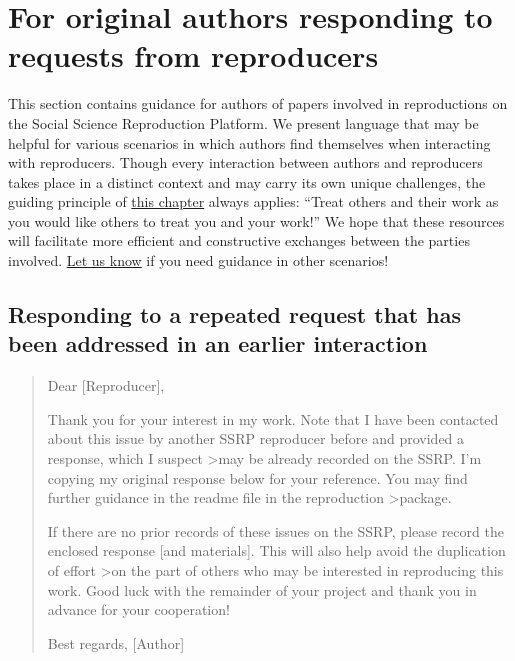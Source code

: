 \documentclass[
]{book}
\begin{document}
\hypertarget{for-original-authors-responding-to-requests-from-reproducers}{%
\section{For original authors responding to requests from reproducers}\label{for-original-authors-responding-to-requests-from-reproducers}}

This section contains guidance for authors of papers involved in reproductions on the Social Science Reproduction Platform. We present language that may be helpful for various scenarios in which authors find themselves when interacting with reproducers. Though every interaction between authors and reproducers takes place in a distinct context and may carry its own unique challenges, the guiding principle of \href{https://bitss.github.io/ACRE/guidance-for-a-constructive-exchange-between-reproducers-and-original-authors.html}{this chapter} always applies: ``Treat others and their work as you would like others to treat you and your work!'' We hope that these resources will facilitate more efficient and constructive exchanges between the parties involved. \href{emailto:acre@berkeley.edu}{Let us know} if you need guidance in other scenarios!

\hypertarget{responding-to-a-repeated-request-that-has-been-addressed-in-an-earlier-interaction}{%
\subsection{Responding to a repeated request that has been addressed in an earlier interaction}\label{responding-to-a-repeated-request-that-has-been-addressed-in-an-earlier-interaction}}

\begin{quote}
Dear {[}Reproducer{]},

Thank you for your interest in my work. Note that I have been contacted about this issue by another SSRP reproducer before and provided a response, which I suspect \textgreater may be already recorded on the SSRP. I'm copying my original response below for your reference. You may find further guidance in the readme file in the reproduction \textgreater package.

If there are no prior records of these issues on the SSRP, please record the enclosed response {[}and materials{]}. This will also help avoid the duplication of effort \textgreater on the part of others who may be interested in reproducing this work.
Good luck with the remainder of your project and thank you in advance for your cooperation!

Best regards,
{[}Author{]}
\end{quote}
\end{document}
